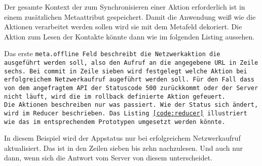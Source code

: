 Der gesamte Kontext der zum Synchronisieren einer Aktion erforderlich ist in einem zusätzlichen Metaattribut gespeichert. Damit die Anwendung weiß wie die Aktionen verarbeitet werden sollen wird sie mit dem Metafeld dekoriert. Die Aktion zum Lesen der Kontakte könnte dann wie im folgenden Listing aussehen.
%
\begin{center}
  
\end{center}
%
Das erste \tt{meta.offline} Feld beschreibt die Netzwerkaktion die ausgeführt werden soll, also den Aufruf an die angegebene URL in Zeile sechs. Bei \tt{commit} in Zeile sieben wird festgelegt welche Aktion bei erfolgreichem Netzwerkaufruf augeführt werden soll. Für den Fall dass von dem angefragtem \gls{API} der Statuscode 500 zurückkommt oder der Server nicht läuft, wird die im \tt{rollback} definierte Aktion gefeuert.\\
Die Aktionen beschreiben nur was passiert. Wie der Status sich ändert, wird im \tt{Reducer} beschrieben. Das Listing \ref{code:reducer} illustriert wie das im entsprechendem Prototypen umgesetzt werden könnte.
%
\begin{center}
  
\end{center}
%
In diesem Beispiel wird der Appstatus nur bei erfolgreichem Netzwerkaufruf aktualisiert. Das ist in den Zeilen sieben bis zehn nachzulesen. Und auch nur dann, wenn sich die Antwort vom Server von diesem unterscheidet.